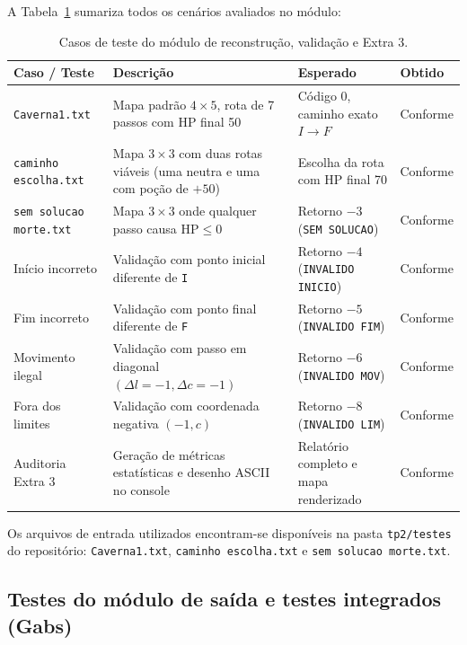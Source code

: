 \documentclass[12pt,a4paper]{article}
\makeatletter
\DeclareRobustCommand{\_}{%
  \ifmmode
    \nfss@text{\textunderscore}%
  \else
    \textunderscore\allowbreak
  \fi
}
\makeatother
\begin{document}
A Tabela~\ref{tab:casos_caminho} sumariza todos os cenários avaliados no módulo:

\begin{table}[htbp]
\centering
\small
\caption{Casos de teste do módulo de reconstrução, validação e Extra 3.}
\label{tab:casos_caminho}
\vspace{0.2cm}
\begin{tabularx}{\textwidth}{|>{\raggedright\arraybackslash}p{3.4cm}|>{\raggedright\arraybackslash}X|>{\centering\arraybackslash}p{2.3cm}|>{\centering\arraybackslash}p{2.0cm}|}
\hline
\textbf{Caso / Teste} & \textbf{Descrição} & \textbf{Esperado} & \textbf{Obtido} \\
\hline
\texttt{Caverna1.txt} & Mapa padrão $4 \times 5$, rota de 7 passos com HP final 50 & Código 0, caminho exato $I \to F$ & Conforme \\
\hline
\texttt{caminho\_escolha.txt} & Mapa $3 \times 3$ com duas rotas viáveis (uma neutra e uma com poção de $+50$) & Escolha da rota com HP final 70 & Conforme \\
\hline
\texttt{sem\_solucao\_morte.txt} & Mapa $3 \times 3$ onde qualquer passo causa $\text{HP} \le 0$ & Retorno $-3$ (\texttt{SEM\_SOLUCAO}) & Conforme \\
\hline
Início incorreto & Validação com ponto inicial diferente de \texttt{I} & Retorno $-4$ (\texttt{INVALIDO\_INICIO}) & Conforme \\
\hline
Fim incorreto & Validação com ponto final diferente de \texttt{F} & Retorno $-5$ (\texttt{INVALIDO\_FIM}) & Conforme \\
\hline
Movimento ilegal & Validação com passo em diagonal $(\Delta l = -1, \Delta c = -1)$ & Retorno $-6$ (\texttt{INVALIDO\_MOV}) & Conforme \\
\hline
Fora dos limites & Validação com coordenada negativa $(-1, c)$ & Retorno $-8$ (\texttt{INVALIDO\_LIM}) & Conforme \\
\hline
Auditoria Extra 3 & Geração de métricas estatísticas e desenho ASCII no console & Relatório completo e mapa renderizado & Conforme \\
\hline
\end{tabularx}
\end{table}

Os arquivos de entrada utilizados encontram-se disponíveis na pasta \texttt{tp2/testes} do repositório: \texttt{Caverna1.txt}, \texttt{caminho\_escolha.txt} e \texttt{sem\_solucao\_morte.txt}.

\subsection{Testes do módulo de saída e testes integrados (Gabs)}
\end{document}
